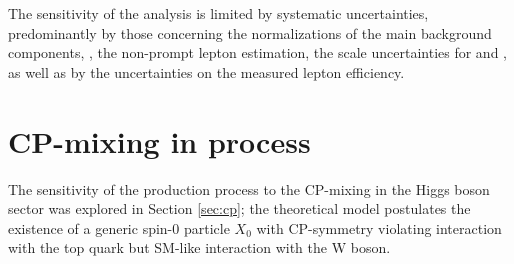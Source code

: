 The sensitivity of the analysis is limited by systematic uncertainties, predominantly by those concerning the normalizations of the main background components, \ie, the non-prompt lepton estimation, the scale uncertainties for \ttW and \ttZ, as well as by the uncertainties on the measured lepton efficiency.

\section{CP-mixing in \tH process}

The sensitivity of the \tH production process to the CP-mixing in the Higgs boson sector was explored in Section \ref{sec:cp}; the theoretical model postulates the existence of a generic spin-0 particle $X_0$ with CP-symmetry violating interaction with the top quark but SM-like interaction with the W boson.

